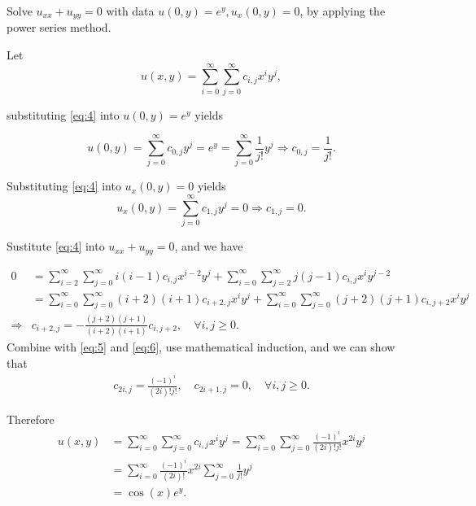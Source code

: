 \begin{pro}
  Solve $u_{xx}+u_{yy}=0$ with data
  $u(0, y)=e^y, u_x(0, y)=0$,
  by applying the power series method.
\end{pro}

\begin{sol}
  Let
  \begin{equation}
    \label{eq:4}
    u(x, y) = \sum_{i=0}^{\infty}\sum_{j=0}^{\infty}c_{i,j}x^iy^j,
  \end{equation}

  substituting \eqref{eq:4} into $u(0, y)=e^y$ yields

  \begin{equation}
    \label{eq:5}
    u(0, y) = \sum_{j=0}^{\infty}c_{0,j}y^j = e^y =
    \sum_{j=0}^{\infty}\frac{1}{j!}y^j \Rightarrow c_{0,j} = \frac{1}{j!}.
  \end{equation}

  Substituting \eqref{eq:4} into $u_x(0, y)=0$ yields
  \begin{equation}
    \label{eq:6}
    u_x(0, y) = \sum_{j=0}^{\infty}c_{1,j}y^j = 0 \Rightarrow c_{1,j} = 0.
  \end{equation}

  Sustitute \eqref{eq:4} into $u_{xx}+u_{yy}=0$,
  and we have

  \begin{align*}
    0 &= \sum_{i=2}^{\infty}\sum_{j=0}^{\infty}i(i-1)c_{i,j}x^{i-2}y^j +
        \sum_{i=0}^{\infty}\sum_{j=2}^{\infty}j(j-1)c_{i,j}x^iy^{j-2}  \\
      &= \sum_{i=0}^{\infty}\sum_{j=0}^{\infty}(i+2)(i+1)c_{i+2,j}x^iy^j +
        \sum_{i=0}^{\infty}\sum_{j=0}^{\infty}(j+2)(j+1)c_{i,j+2}x^iy^j \\
    \Rightarrow& c_{i+2, j} = -\frac{(j+2)(j+1)}{(i+2)(i+1)}c_{i, j+2}, \quad
                 \forall i, j\ge 0.
  \end{align*}
  Combine with \eqref{eq:5} and \eqref{eq:6},
  use mathematical induction,
  and we can show that
  \begin{align*}
    c_{2i, j} = \frac{(-1)^i}{(2i)!j!}, \quad c_{2i+1,j} = 0, \quad \forall i, j\ge 0.
  \end{align*}

  Therefore
  \begin{align*}
    u(x, y) &= \sum_{i=0}^{\infty}\sum_{j=0}^{\infty}c_{i,j}x^iy^j
              = \sum_{i=0}^{\infty}\sum_{j=0}^{\infty}\frac{(-1)^i}{(2i)!j!}x^{2i}y^j \\
            &= \sum_{i=0}^{\infty}\frac{(-1)^i}{(2i)!}x^{2i}\sum_{j=0}^{\infty}\frac{1}{j!}y^j \\
    &= \cos(x)e^y.
  \end{align*}
\end{sol}
